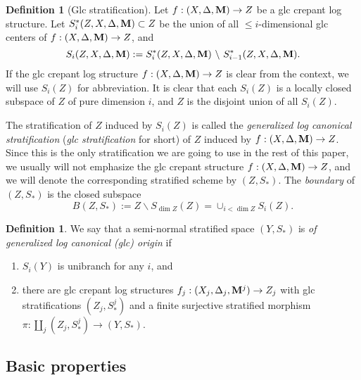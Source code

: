 \documentclass[11pt]{amsart}
\numberwithin{equation}{section}
\newcommand{\Mm}{{\bf{M}}}
\theoremstyle{definition}
\newtheorem{defn}[thm]{Definition}
\theoremstyle{definition}
\theoremstyle{definition}
\begin{document}
\begin{defn}[Glc stratification]
  Let $f:(X,\Delta,\Mm)\to Z$ be a glc crepant log structure. Let
  $S^*_i(Z,X,\Delta,\Mm)\subset Z$ be the union of all $\le
  i$-dimensional glc centers of $f:(X,\Delta,\Mm)\to Z$, and
  $$
  S_i(Z,X,\Delta,\Mm):=S^*_i(Z,X,\Delta,\Mm)~\backslash
  ~S^*_{i-1}(Z,X,\Delta,\Mm).
  $$
  If the glc crepant log structure $f:(X,\Delta,\Mm)\to Z$ is clear
  from the context, we will use $S_i(Z)$ for abbreviation. It is
  clear that each $S_i(Z)$ is a locally closed subspace of $Z$ of
  pure dimension $i$, and $Z$ is the disjoint union of all $S_i(Z)$.

  The stratification of $Z$ induced by $S_i(Z)$ is called the
  \emph{generalized log canonical stratification} (\emph{glc
  stratification} for short) of $Z$ induced by $f:(X,\Delta,\Mm)\to
  Z$.  Since this is the only stratification we are going to use in
  the rest of this paper, we usually will not emphasize the glc
  crepant structure $f:(X,\Delta,\Mm)\to Z$, and we will denote the
  corresponding stratified scheme by $(Z,S_*)$. The \emph{boundary}
  of $(Z,S_*)$ is the closed subspace
  $$B(Z,S_*):=Z\backslash S_{\dim Z}(Z)=\cup_{i<\dim Z}S_i(Z).$$
\end{defn}

\begin{defn}\label{defn: of glc origin}
  We say that a semi-normal stratified space $(Y,S_*)$ is \textit{of
  generalized log canonical (glc) origin} if
  \begin{enumerate}
    \item $S_i(Y)$ is unibranch for any $i$, and
    \item there are glc crepant log structures
      $f_j:(X_j,\Delta_j,\Mm^j)\to Z_j$ with glc stratifications
      $(Z_j,S_{*}^j)$ and a finite surjective stratified morphism
      $\pi: \amalg_j(Z_j,S_{*}^j)\to (Y,S_*)$.
  \end{enumerate}

\end{defn}

\subsection{Basic properties}
\end{document}
